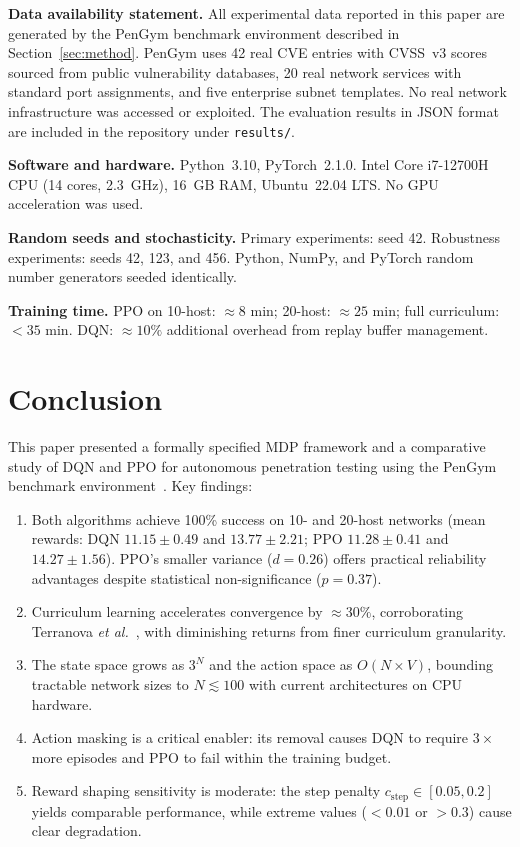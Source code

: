 \documentclass[conference]{IEEEtran}
\begin{document}
\textbf{Data availability statement.}  All experimental data reported
in this paper are generated by the PenGym benchmark environment described
in Section~\ref{sec:method}.  PenGym uses 42 real CVE entries
with CVSS~v3 scores sourced from public vulnerability databases, 20
real network services with standard port assignments, and five
enterprise subnet templates.  No real network infrastructure was
accessed or exploited.  The evaluation results in JSON format are
included in the repository under \texttt{results/}.

\textbf{Software and hardware.}  Python~3.10, PyTorch~2.1.0.  Intel
Core i7-12700H CPU (14 cores, 2.3~GHz), 16~GB RAM, Ubuntu~22.04 LTS.
No GPU acceleration was used.

\textbf{Random seeds and stochasticity.}  Primary experiments: seed 42.
Robustness experiments: seeds 42, 123, and 456.  Python, NumPy, and
PyTorch random number generators seeded identically.

\textbf{Training time.}  PPO on 10-host: ${\approx}8$ min; 20-host:
${\approx}25$ min; full curriculum: ${<}35$ min.  DQN: ${\approx}10\%$
additional overhead from replay buffer management.

\section{Conclusion}
\label{sec:conclusion}

This paper presented a formally specified MDP framework and a
comparative study of DQN and PPO for autonomous penetration testing
using the PenGym benchmark environment~\cite{nguyen2025cose}.  Key findings:

\begin{enumerate}[noitemsep]
  \item Both algorithms achieve 100\% success on 10- and 20-host
        networks (mean rewards: DQN $11.15 \pm 0.49$ and $13.77 \pm
        2.21$; PPO $11.28 \pm 0.41$ and $14.27 \pm 1.56$).  PPO's
        smaller variance ($d = 0.26$) offers practical reliability
        advantages despite statistical non-significance ($p = 0.37$).
  \item Curriculum learning accelerates convergence by ${\approx}30\%$,
        corroborating Terranova \emph{et al.}~\cite{terranova2024raid},
        with diminishing returns from finer curriculum granularity.
  \item The state space grows as $3^N$ and the action space as
        $O(N \times V)$, bounding tractable network sizes to
        $N \lesssim 100$ with current architectures on CPU hardware.
  \item Action masking is a critical enabler: its removal causes
        DQN to require $3\times$ more episodes and PPO to fail
        within the training budget.
  \item Reward shaping sensitivity is moderate: the step penalty
        $c_{\text{step}} \in [0.05, 0.2]$ yields comparable
        performance, while extreme values ($< 0.01$ or $> 0.3$)
        cause clear degradation.
\end{enumerate}
\end{document}
